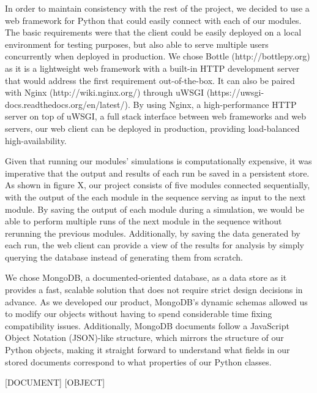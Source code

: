 \documentclass[a4paper,11pt]{article}
\begin{document}
In order to maintain consistency with the rest of the project, we decided to use a web framework for Python that could easily connect with each of our modules. The basic requirements were that the client could be easily deployed on a local environment for testing purposes, but also able to serve multiple users concurrently when deployed in production. We chose Bottle (http://bottlepy.org) as it is a lightweight web framework with a built-in HTTP development server that would address the first requirement out-of-the-box. It can also be paired with Nginx (http://wiki.nginx.org/) through uWSGI (https://uwsgi-docs.readthedocs.org/en/latest/). By using Nginx, a high-performance HTTP server on top of uWSGI, a full stack interface between web frameworks and web servers, our web client can be deployed in production, providing load-balanced high-availability.

Given that running our modules' simulations is computationally expensive, it was imperative that the output and results of each run be saved in a persistent store. As shown in figure X, our project consists of five modules connected sequentially, with the output of the each module in the sequence serving as input to the next module. By saving the output of each module during a simulation, we would be able to perform multiple runs of the next module in the sequence without rerunning the previous modules. Additionally, by saving the data generated by each run, the web client can provide a view of the results for analysis by simply querying the database instead of generating them from scratch.

We chose MongoDB, a documented-oriented database, as a data store as it provides a fast, scalable solution that does not require strict design decisions in advance. As we developed our product, MongoDB's dynamic schemas allowed us to modify our objects without having to spend considerable time fixing compatibility issues. Additionally, MongoDB documents follow a JavaScript Object Notation (JSON)-like structure, which mirrors the structure of our Python objects, making it straight forward to understand what fields in our stored documents correspond to what properties of our Python classes.

[DOCUMENT] [OBJECT]
\end{document}
